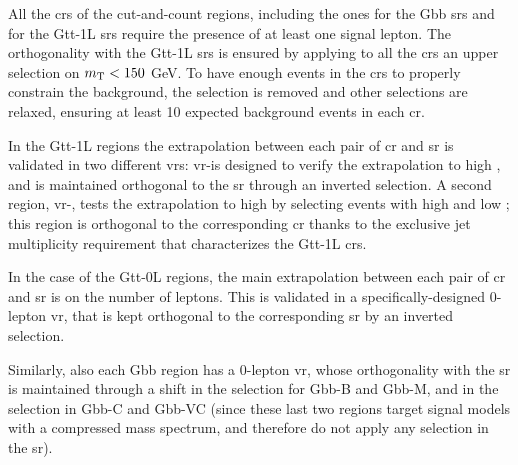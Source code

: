 All the \glspl{cr} of the cut-and-count regions, including the ones for the Gbb \glspl{sr} and for the Gtt-1L \glspl{sr}
require the presence of at least one signal lepton. 
The orthogonality with the Gtt-1L \glspl{sr} is ensured by applying to all the \glspl{cr} an upper selection on $m_\mathrm{T} < 150$ GeV.
To have enough events in the \glspl{cr} to properly constrain the \ttbar background, the 
\mtb selection is removed and other selections are relaxed, ensuring at least 10 expected background events in each \gls{cr}.

In the Gtt-1L regions the extrapolation between each pair of \gls{cr} and \gls{sr} is validated in two different \glspl{vr}:
\gls{vr}-\mt is designed to verify the extrapolation to high \mt, and is maintained orthogonal to the \gls{sr} through an inverted \mjsum 
selection. A second region, \gls{vr}-\mtb, tests the extrapolation to high \mtb by selecting events with high \mtb and low \mt; 
this region is orthogonal to the corresponding \gls{cr} thanks to the exclusive jet multiplicity requirement that characterizes
the Gtt-1L \glspl{cr}.

In the case of the Gtt-0L regions, the main extrapolation between each pair of \gls{cr} and \gls{sr} is on the number of leptons. 
This is validated in a specifically-designed 0-lepton \gls{vr}, 
that is kept orthogonal to the corresponding \gls{sr} by an inverted \mjsum selection.

Similarly, also each Gbb region has a 0-lepton \gls{vr}, whose orthogonality with the \gls{sr} is maintained through 
a shift in the \meff selection for Gbb-B and Gbb-M, and in the \met selection in Gbb-C and Gbb-VC (since these last 
two regions target signal models with a compressed mass spectrum, and therefore do not apply any \meff selection in the \gls{sr}).



